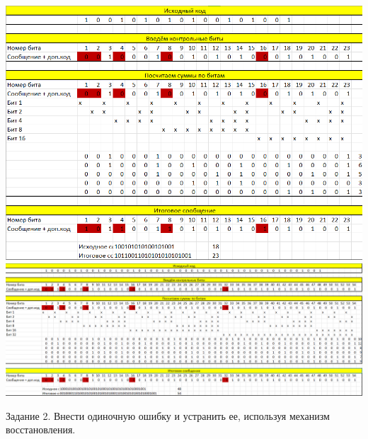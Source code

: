 \documentclass[a4paper,14pt]{extarticle}
\begin{document}
\begin{center}
\includegraphics[width=140mm]{1_16}\\
\includegraphics[width=200mm]{1_48}
\end{center}
Задание 2. Внести одиночную ошибку и устранить ее, используя механизм
восстановления.
\end{document}
